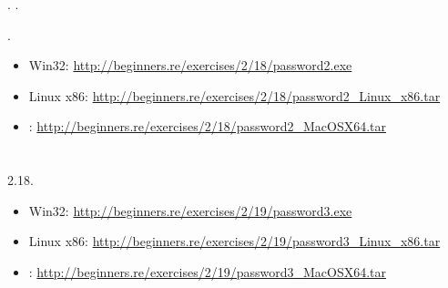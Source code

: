 . 
.

.

\begin{itemize}
\item Win32: \url{http://beginners.re/exercises/2/18/password2.exe}
\item Linux x86: \url{http://beginners.re/exercises/2/18/password2_Linux_x86.tar}
\item \MacOSX: \url{http://beginners.re/exercises/2/18/password2_MacOSX64.tar}
\end{itemize}

\section{}

 2.18.

\begin{itemize}
\item Win32: \url{http://beginners.re/exercises/2/19/password3.exe}
\item Linux x86: \url{http://beginners.re/exercises/2/19/password3_Linux_x86.tar}
\item \MacOSX: \url{http://beginners.re/exercises/2/19/password3_MacOSX64.tar}
\end{itemize}

